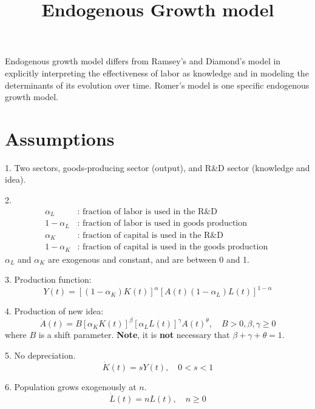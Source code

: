 \documentclass[12pt]{article}
\title{Endogenous Growth model}
\author{}
\date{}
\begin{document}
\maketitle

Endogenous growth model differs from Ramsey's and Diamond's model in explicitly 
interpreting the effectiveness of labor as knowledge and in modeling the determinants
of its evolution over time. Romer's model is one specific endogenous growth model.



\section{Assumptions}
1. Two sectors, goods-producing sector (output), and R\&D sector (knowledge and idea).

2. 
\begin{align*}
		\alpha_{L}&: \text{ fraction of labor is used in the R\&D }\\
		1 - \alpha_{L}&: \text{ fraction of labor is used in goods production }\\
		\alpha_{K}&: \text{ fraction of capital is used in the R\&D }\\
		1 -  \alpha_{K}&: \text{ fraction of capital is used in the goods production }
\end{align*}
$ \alpha_{L} $ and $ \alpha_{K} $ are exogenous and constant, and are between 0 and 1.


3. Production function:
\begin{equation*}
Y(t) = \left[ (1 - \alpha_{K}) K(t) \right] ^{\alpha}
\left[ A(t)(1 - \alpha_{L})L(t) \right] ^{1 - \alpha}
\end{equation*}


4. Production of new idea:
\begin{equation*}
		\dot{A}(t) = B[\alpha_{K}K(t)]^{\beta}[\alpha_{L}L(t)]^{\gamma}A(t)^{\theta},
		\quad B > 0, \beta, \gamma \ge 0
\end{equation*}
where $ B $ is a shift parameter.
{\textbf {Note}}, it is {\textbf {not}} necessary that $ \beta + \gamma + \theta =1 $.


5. No depreciation.
\begin{equation*}
\dot{K}(t) = sY(t), \quad 0 < s < 1
\end{equation*}

6. Population grows exogenously at $ n $.
\begin{equation*}
\dot{L}(t) = n L(t), \quad n \ge 0
\end{equation*}
\end{document}
